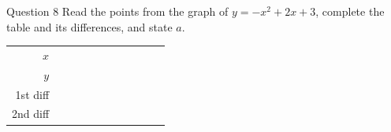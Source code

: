 \documentclass[11pt]{article}
\begin{document}
\begin{qbox}{Question 8}
Read the points from the graph of $y=-x^2+2x+3$, complete the table and its differences, and state $a$.
\begin{center}\end{center}
\begin{center}\renewcommand{\arraystretch}{1.15}\setlength{\tabcolsep}{2pt}\begin{tabular}{r|>{\centering\arraybackslash}p{0.62cm}>{\centering\arraybackslash}p{0.62cm}>{\centering\arraybackslash}p{0.62cm}>{\centering\arraybackslash}p{0.62cm}>{\centering\arraybackslash}p{0.62cm}>{\centering\arraybackslash}p{0.62cm}>{\centering\arraybackslash}p{0.62cm}>{\centering\arraybackslash}p{0.62cm}>{\centering\arraybackslash}p{0.62cm}>{\centering\arraybackslash}p{0.62cm}}
$x$ & \multicolumn{2}{c}{\colorbox{iagreen}{\makebox[1.12cm]{\strut \color{white}\bfseries $-1$}}} & \multicolumn{2}{c}{\colorbox{iagreen}{\makebox[1.12cm]{\strut \color{white}\bfseries $0$}}} & \multicolumn{2}{c}{\colorbox{iagreen}{\makebox[1.12cm]{\strut \color{white}\bfseries $1$}}} & \multicolumn{2}{c}{\colorbox{iagreen}{\makebox[1.12cm]{\strut \color{white}\bfseries $2$}}} & \multicolumn{2}{c}{\colorbox{iagreen}{\makebox[1.12cm]{\strut \color{white}\bfseries $3$}}} \\[2pt]
$y$ & \multicolumn{2}{c}{\fbox{\makebox[0.94cm]{\strut}}} & \multicolumn{2}{c}{\fbox{\makebox[0.94cm]{\strut}}} & \multicolumn{2}{c}{\fbox{\makebox[0.94cm]{\strut}}} & \multicolumn{2}{c}{\fbox{\makebox[0.94cm]{\strut}}} & \multicolumn{2}{c}{\fbox{\makebox[0.94cm]{\strut}}} \\[2pt]
\textcolor{exblue}{\scriptsize 1st diff} & & \multicolumn{2}{c}{\fbox{\makebox[0.94cm]{\strut}}} & \multicolumn{2}{c}{\fbox{\makebox[0.94cm]{\strut}}} & \multicolumn{2}{c}{\fbox{\makebox[0.94cm]{\strut}}} & \multicolumn{2}{c}{\fbox{\makebox[0.94cm]{\strut}}} & \\[2pt]
\textcolor{qorange}{\scriptsize 2nd diff} & & & \multicolumn{2}{c}{\fbox{\makebox[0.94cm]{\strut}}} & \multicolumn{2}{c}{\fbox{\makebox[0.94cm]{\strut}}} & \multicolumn{2}{c}{\fbox{\makebox[0.94cm]{\strut}}} & & \\
\end{tabular}\end{center}\workspace{1.2cm}
\end{qbox}
\end{document}
